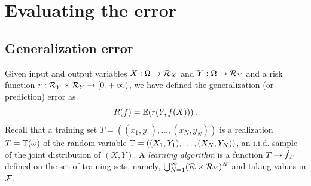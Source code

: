 %
%

\section{Evaluating the  error}
\label{sec:error}

\subsection{Generalization error}
Given input and output variables $X:\Omega\to {\mathcal R}_X$ and $Y:\Omega\to{\mathcal R}_Y$ and a risk function $r: {\mathcal R}_Y\times {\mathcal R}_Y \to [0. +\infty)$, we have defined the generalization (or prediction) error as
$$
R(f) = \bm{\mathbb E}(r(Y, f(X)))\,.
$$
Recall that a training set $T = ((x_1, y_1), \ldots, (x_N, y_N))$ is a realization $T = {\mathbb T}(\omega)$ of  the random variable ${\mathbb T}=((X_1, Y_1), \ldots, (X_N,
Y_N))$, an i.i.d. sample of the joint distribution of $(X,Y)$. A {\em learning algorithm} is a function $T \mapsto {\hat{f}}_{T}$ defined on the set of training sets, namely, $\bigcup_{N=1}^\infty ({\mathcal R}\times{\mathcal R}_Y)^{N}$ and taking values in ${\mathcal F}$.  



